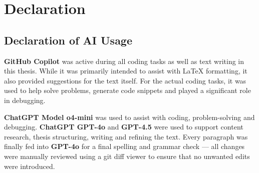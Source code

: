 


\section{Declaration}
\label{declaration}

\subsection{Declaration of AI Usage}%

\textbf{GitHub Copilot} was active during all coding tasks as well as text writing in this thesis.
While it was primarily intended to assist with LaTeX formatting, it also provided suggestions for the text itself.
For the actual coding tasks, it was used to help solve problems, generate code snippets and played a significant role in debugging.

\textbf{ChatGPT Model o4-mini} was used to assist with coding, problem-solving and debugging.
\textbf{ChatGPT GPT-4o} and \textbf{GPT-4.5} were used to support content research, thesis structuring, writing and refining the text.
Every paragraph was finally fed into \textbf{GPT-4o} for a final spelling and grammar check --- all changes were manually reviewed using a git diff viewer to ensure that no unwanted edits were introduced.

\newpage
{}

